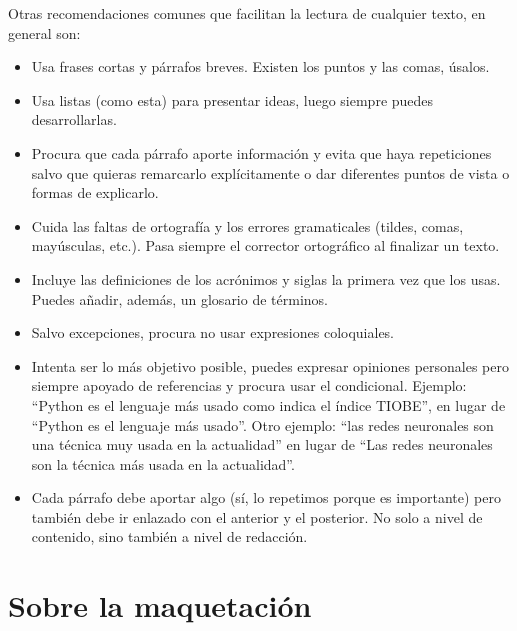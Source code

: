 Otras recomendaciones comunes que facilitan la lectura de cualquier texto, en general son:
\begin{itemize}
    \item Usa frases cortas y párrafos breves. Existen los puntos y las comas, úsalos.
    \item Usa listas (como esta) para presentar ideas, luego siempre puedes desarrollarlas.
    \item Procura que cada párrafo aporte información y evita que haya repeticiones salvo que quieras remarcarlo explícitamente o dar diferentes puntos de vista o formas de explicarlo.  
    \item Cuida las faltas de ortografía y los errores gramaticales (tildes, comas, mayúsculas, etc.). Pasa siempre el corrector ortográfico al finalizar un texto.
    \item Incluye las definiciones de los acrónimos y siglas la primera vez que los usas. Puedes añadir, además, un glosario de términos.
    \item Salvo excepciones, procura no usar expresiones coloquiales.
    \item Intenta ser lo más objetivo posible, puedes expresar opiniones personales pero siempre apoyado de referencias y procura usar el condicional. Ejemplo: ``Python es el lenguaje más usado como indica el índice TIOBE'', en lugar de ``Python es el lenguaje más usado''. Otro ejemplo: ``las redes neuronales son una técnica muy usada en la actualidad'' en lugar de ``Las redes neuronales son la técnica más usada en la actualidad''.
    \item Cada párrafo debe aportar algo (sí, lo repetimos porque es importante) pero también debe ir enlazado con el anterior y el posterior. No solo a nivel de contenido, sino también a nivel de redacción.
\end{itemize}



\section{Sobre la maquetación}  %



